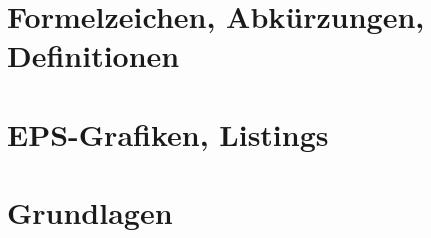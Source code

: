 






\setcounter{secnumdepth}{2}
\tableofcontents

\chapter{Formelzeichen, Abkürzungen, Definitionen}


\chapter{EPS-Grafiken, Listings}


\chapter{Grundlagen}



\listoffigures
\listoftables





\appendix












